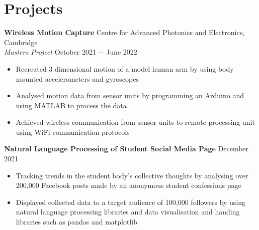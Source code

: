 \documentclass{article}
\begin{document}
\vspace{-0.75\baselineskip}
\hrulefill
\vspace{-0.75\baselineskip}

\section*{Projects}

\textbf{Wireless Motion Capture} \hfill Centre for Advanced Photonics and Electronics, Cambridge\\
\textit{Masters Project} \hfill October 2021 $-$ June 2022
\begin{itemize}
    \item Recreated 3 dimensional motion of a model human arm by using body mounted accelerometers and gyroscopes
    \item Analysed motion data from sensor units by programming an Arduino and using MATLAB to process the data
    \item Achieved wireless communication from sensor units to remote processing unit using WiFi communication protocols
\end{itemize} \medskip

\textbf{Natural Language Processing of Student Social Media Page} \hfill December 2021
\begin{itemize}
    \item Tracking trends in the student body's collective thoughts by analysing over 200,000 Facebook posts made by an anonymous student confessions page
    \item Displayed collected data to a target audience of 100,000 followers by using natural language processing libraries and data visualisation and handing libraries such as pandas and matplotlib
\end{itemize} \medskip
\end{document}
